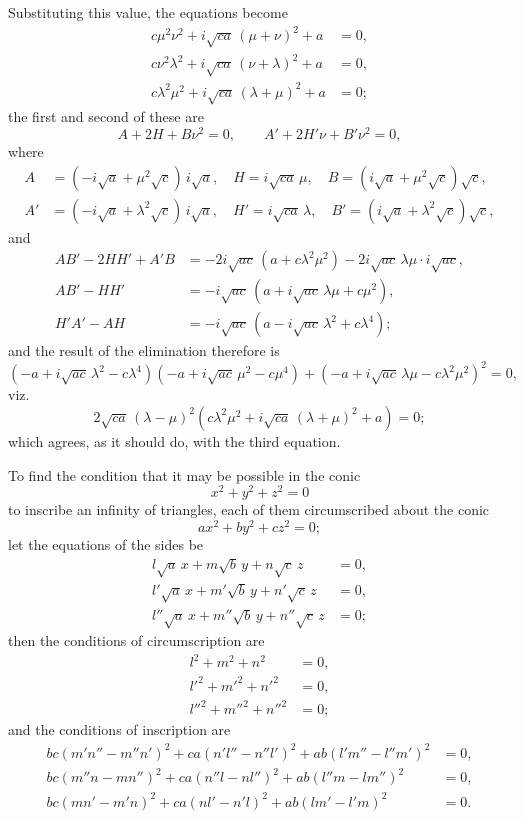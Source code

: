 \documentclass[12pt,a4paper]{article}
\theoremstyle{plain}
\begin{document}
Substituting this value, the equations become
\begin{align*}
c\mu^2\nu^2+i\sqrt{ca}\,(\mu+\nu)^2+a&=0,\\
c\nu^2\lambda^2+i\sqrt{ca}\,(\nu+\lambda)^2+a&=0,\\
c\lambda^2\mu^2+i\sqrt{ca}\,(\lambda+\mu)^2+a&=0;
\end{align*}
the first and second of these are
\[
A+2H+B\nu^2=0,\qquad A'+2H'\nu+B'\nu^2=0,
\]
where
\begin{align*}
A&=(-i\sqrt{a}+\mu^2\sqrt{c})\,i\sqrt{a},\quad H=i\sqrt{ca}\,\mu,\quad B=(i\sqrt{a}+\mu^2\sqrt{c})\sqrt{c},\\
A'&=(-i\sqrt{a}+\lambda^2\sqrt{c})\,i\sqrt{a},\quad H'=i\sqrt{ca}\,\lambda,\quad B'=(i\sqrt{a}+\lambda^2\sqrt{c})\sqrt{c},
\end{align*}
and
\begin{align*}
AB'-2HH'+A'B &= -2i\sqrt{ac}\,(a+c\lambda^2\mu^2)-2i\sqrt{ac}\,\lambda\mu\cdot i\sqrt{ac},\\
AB'-HH' &= -i\sqrt{ac}\,(a+i\sqrt{ac}\,\lambda\mu+c\mu^2),\\
H'A'-AH &= -i\sqrt{ac}\,(a-i\sqrt{ac}\,\lambda^2+c\lambda^4);
\end{align*}
and the result of the elimination therefore is
\[
(-a+i\sqrt{ac}\,\lambda^2-c\lambda^4)(-a+i\sqrt{ac}\,\mu^2-c\mu^4)+(-a+i\sqrt{ac}\,\lambda\mu-c\lambda^2\mu^2)^2=0,
\]
viz.
\[
2\sqrt{ca}\,(\lambda-\mu)^2(c\lambda^2\mu^2+i\sqrt{ca}\,(\lambda+\mu)^2+a)=0;
\]
which agrees, as it should do, with the third equation.

\bigskip

To find the condition that it may be possible in the conic
\[
x^2+y^2+z^2=0
\]
to inscribe an infinity of triangles, each of them circumscribed about the conic
\[
ax^2+by^2+cz^2=0;
\]
let the equations of the sides be
\begin{align*}
l\sqrt{a}\,x+m\sqrt{b}\,y+n\sqrt{c}\,z&=0,\\
l'\sqrt{a}\,x+m'\sqrt{b}\,y+n'\sqrt{c}\,z&=0,\\
l''\sqrt{a}\,x+m''\sqrt{b}\,y+n''\sqrt{c}\,z&=0;
\end{align*}
then the conditions of circumscription are
\begin{align*}
l^2+m^2+n^2&=0,\\
l'^2+m'^2+n'^2&=0,\\
l''^2+m''^2+n''^2&=0;
\end{align*}
and the conditions of inscription are
\begin{align*}
bc(m'n''-m''n')^2+ca(n'l''-n''l')^2+ab(l'm''-l''m')^2&=0,\\
bc(m''n-mn'')^2+ca(n''l-nl'')^2+ab(l''m-lm'')^2&=0,\\
bc(mn'-m'n)^2+ca(nl'-n'l)^2+ab(lm'-l'm)^2&=0.
\end{align*}
\end{document}
